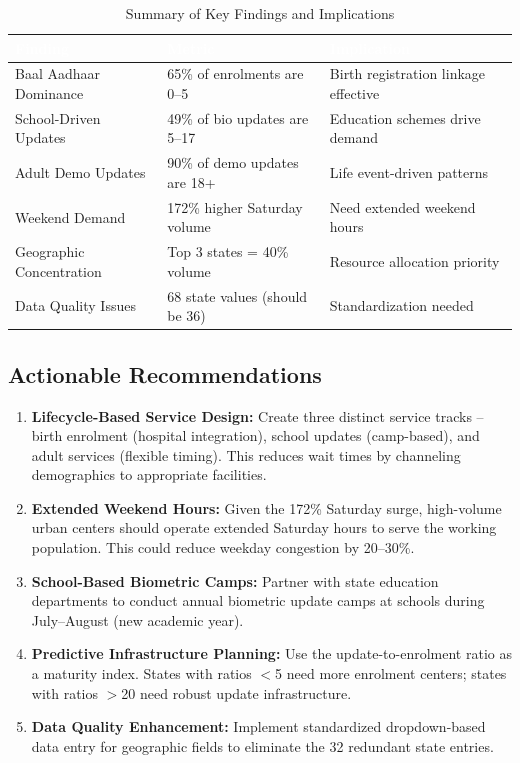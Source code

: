 \documentclass[11pt,a4paper]{article}
\begin{document}
\begin{table}[H]
\centering
\caption{Summary of Key Findings and Implications}
\begin{tabular}{p{3.5cm}p{4cm}p{5cm}}
\toprule
\rowcolor{primaryblue}
\textcolor{white}{\textbf{Finding}} & \textcolor{white}{\textbf{Metric}} & \textcolor{white}{\textbf{Implication}} \\
\midrule
Baal Aadhaar Dominance & 65\% of enrolments are 0--5 & Birth registration linkage effective \\
School-Driven Updates & 49\% of bio updates are 5--17 & Education schemes drive demand \\
Adult Demo Updates & 90\% of demo updates are 18+ & Life event-driven patterns \\
Weekend Demand & 172\% higher Saturday volume & Need extended weekend hours \\
Geographic Concentration & Top 3 states = 40\% volume & Resource allocation priority \\
Data Quality Issues & 68 state values (should be 36) & Standardization needed \\
\bottomrule
\end{tabular}
\end{table}

\subsection{Actionable Recommendations}

\begin{enumerate}
    \item \textbf{Lifecycle-Based Service Design:} Create three distinct service tracks -- birth enrolment (hospital integration), school updates (camp-based), and adult services (flexible timing). This reduces wait times by channeling demographics to appropriate facilities.
    
    \item \textbf{Extended Weekend Hours:} Given the 172\% Saturday surge, high-volume urban centers should operate extended Saturday hours to serve the working population. This could reduce weekday congestion by 20--30\%.
    
    \item \textbf{School-Based Biometric Camps:} Partner with state education departments to conduct annual biometric update camps at schools during July--August (new academic year).
    
    \item \textbf{Predictive Infrastructure Planning:} Use the update-to-enrolment ratio as a maturity index. States with ratios $<$5 need more enrolment centers; states with ratios $>$20 need robust update infrastructure.
    
    \item \textbf{Data Quality Enhancement:} Implement standardized dropdown-based data entry for geographic fields to eliminate the 32 redundant state entries.
\end{enumerate}
\end{document}
